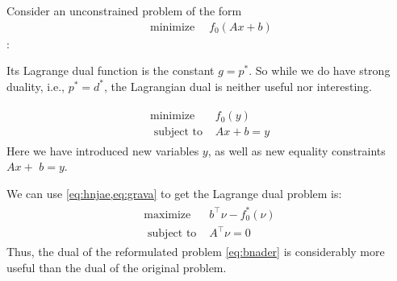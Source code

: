 \documentclass{article}
\begin{document}
Consider an unconstrained problem of the form
\begin{align*}
\operatorname{minimize} \quad f_{0}(A x+b)
\end{align*}
:

Its Lagrange dual function is the constant $g=p^{* }$. So while we do have strong duality, i.e., $p^{* }=d^{* }$, the Lagrangian dual is neither useful nor interesting.

\begin{align}
\begin{array}{ll}
\operatorname{minimize} & f_{0}(y) \\
\text { subject to } & A x+b=y
\end{array}\label{eq:bnader}
\end{align}
Here we have introduced new variables $y$, as well as new equality constraints $A x+$ $b=y$. 



We can use \cref{eq:hnjae,eq:grava} to get the  Lagrange dual problem is:
\begin{align*}
\begin{array}{ll}
\operatorname{maximize} & b^{\top} \nu-f_{0}^{*}(\nu) \\
\text { subject to } & A^{\top} \nu=0
\end{array}
\end{align*}
Thus, the dual of the reformulated problem \cref{eq:bnader} is considerably more useful than the dual of the original problem.
\end{document}
